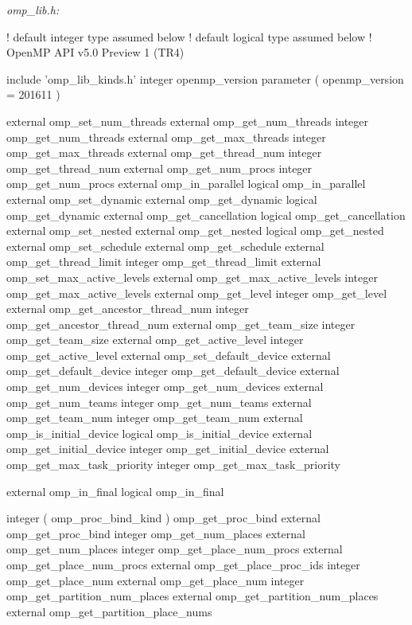 \emph{omp\_lib.h:}

{\small \begin{codepar}
! default integer type assumed below
! default logical type assumed below
! OpenMP API v5.0 Preview 1 (TR4)

     include 'omp\_lib\_kinds.h'
     integer openmp\_version
     parameter ( openmp\_version = 201611 )

     external omp\_set\_num\_threads
     external omp\_get\_num\_threads
     integer omp\_get\_num\_threads
     external omp\_get\_max\_threads
     integer omp\_get\_max\_threads
     external omp\_get\_thread\_num
     integer omp\_get\_thread\_num
     external omp\_get\_num\_procs
     integer omp\_get\_num\_procs
     external omp\_in\_parallel
     logical omp\_in\_parallel
     external omp\_set\_dynamic
     external omp\_get\_dynamic
     logical omp\_get\_dynamic
     external omp\_get\_cancellation
     logical omp\_get\_cancellation
     external omp\_set\_nested
     external omp\_get\_nested
     logical omp\_get\_nested
     external omp\_set\_schedule
     external omp\_get\_schedule
     external omp\_get\_thread\_limit
     integer omp\_get\_thread\_limit
     external omp\_set\_max\_active\_levels
     external omp\_get\_max\_active\_levels
     integer omp\_get\_max\_active\_levels
     external omp\_get\_level
     integer omp\_get\_level
     external omp\_get\_ancestor\_thread\_num
     integer omp\_get\_ancestor\_thread\_num
     external omp\_get\_team\_size
     integer omp\_get\_team\_size
     external omp\_get\_active\_level
     integer omp\_get\_active\_level
     external omp\_set\_default\_device
     external omp\_get\_default\_device
     integer omp\_get\_default\_device
     external omp\_get\_num\_devices
     integer omp\_get\_num\_devices
     external omp\_get\_num\_teams
     integer omp\_get\_num\_teams
     external omp\_get\_team\_num
     integer omp\_get\_team\_num
     external omp\_is\_initial\_device
     logical omp\_is\_initial\_device
     external omp\_get\_initial\_device
     integer omp\_get\_initial\_device
     external omp\_get\_max\_task\_priority
     integer omp\_get\_max\_task\_priority

     external omp\_in\_final
     logical omp\_in\_final

     integer ( omp\_proc\_bind\_kind ) omp\_get\_proc\_bind
     external omp\_get\_proc\_bind
     integer omp\_get\_num\_places
     external omp\_get\_num\_places
     integer omp\_get\_place\_num\_procs
     external omp\_get\_place\_num\_procs
     external omp\_get\_place\_proc\_ids
     integer omp\_get\_place\_num
     external omp\_get\_place\_num
     integer omp\_get\_partition\_num\_places
     external omp\_get\_partition\_num\_places
     external omp\_get\_partition\_place\_nums
     

\end{codepar}}
